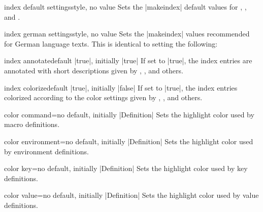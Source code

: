 \begin{docTcbKey}{index default settings}{}{style, no value}
  Sets the |makeindex| default values for
  ,
  , and
  .
\end{docTcbKey}


\begin{docTcbKey}{index german settings}{}{style, no value}
  Sets the |makeindex| values recommended for German language texts.
  This is identical to setting the following:
\begin{dispListing}
\end{dispListing}
\end{docTcbKey}

\clearpage

\begin{docTcbKey}{index annotate}{}{default |true|, initially |true|}
  If set to |true|, the index entries are annotated with short descriptions
  given by , ,
  and others.
\end{docTcbKey}

\begin{docTcbKey}{index colorize}{}{default |true|, initially |false|}
  If set to |true|, the index entries colorized according to the color
  settings given by , ,
  and others.
\end{docTcbKey}


\begin{docTcbKey}{color command}{=}{no default, initially |Definition|}
  Sets the highlight color used by macro definitions.
\end{docTcbKey}

\begin{docTcbKey}{color environment}{=}{no default, initially |Definition|}
  Sets the highlight color used by environment definitions.
\end{docTcbKey}

\begin{docTcbKey}{color key}{=}{no default, initially |Definition|}
  Sets the highlight color used by key definitions.
\end{docTcbKey}

\begin{docTcbKey}{color value}{=}{no default, initially |Definition|}
  Sets the highlight color used by value definitions.
\end{docTcbKey}

